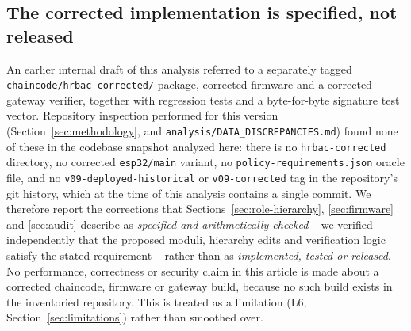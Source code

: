 \subsection{The corrected implementation is specified, not released}
\label{sec:corrected-absent}

An earlier internal draft of this analysis referred to a separately tagged \texttt{chaincode/hrbac-corrected/} package, corrected firmware and a corrected gateway verifier, together with regression tests and a byte-for-byte signature test vector. Repository inspection performed for this version (Section~\ref{sec:methodology}, and \texttt{analysis/DATA\_DISCREPANCIES.md}) found none of these in the codebase snapshot analyzed here: there is no \texttt{hrbac-corrected} directory, no corrected \texttt{esp32/main} variant, no \texttt{policy-requirements.json} oracle file, and no \texttt{v09-deployed-historical} or \texttt{v09-corrected} tag in the repository's git history, which at the time of this analysis contains a single commit. We therefore report the corrections that Sections~\ref{sec:role-hierarchy}, \ref{sec:firmware} and \ref{sec:audit} describe as \emph{specified and arithmetically checked} -- we verified independently that the proposed moduli, hierarchy edits and verification logic satisfy the stated requirement -- rather than as \emph{implemented, tested or released}. No performance, correctness or security claim in this article is made about a corrected chaincode, firmware or gateway build, because no such build exists in the inventoried repository. This is treated as a limitation (L6, Section~\ref{sec:limitations}) rather than smoothed over.
